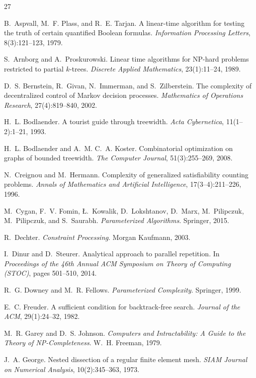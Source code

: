 \documentclass[11pt]{article}
\theoremstyle{plain}
\theoremstyle{definition}
\theoremstyle{remark}
\begin{document}
\begin{thebibliography}{27}

 B.~Aspvall, M.~F. Plass, and R.~E. Tarjan.
A linear-time algorithm for testing the truth of certain quantified Boolean
formulas. \emph{Information Processing Letters}, 8(3):121--123, 1979.

 S.~Arnborg and A.~Proskurowski.
Linear time algorithms for NP-hard problems restricted to partial $k$-trees.
\emph{Discrete Applied Mathematics}, 23(1):11--24, 1989.

 D.~S. Bernstein, R.~Givan, N.~Immerman, and
S.~Zilberstein. The complexity of decentralized control of Markov decision
processes. \emph{Mathematics of Operations Research}, 27(4):819--840, 2002.

 H.~L. Bodlaender.
A tourist guide through treewidth. \emph{Acta Cybernetica},
11(1--2):1--21, 1993.

 H.~L. Bodlaender and A.~M. C.~A. Koster.
Combinatorial optimization on graphs of bounded treewidth.
\emph{The Computer Journal}, 51(3):255--269, 2008.

 N.~Creignou and M.~Hermann.
Complexity of generalized satisfiability counting problems.
\emph{Annals of Mathematics and Artificial Intelligence}, 17(3--4):211--226,
1996.

 M.~Cygan, F.~V. Fomin, \L.~Kowalik, D.~Lokshtanov,
D.~Marx, M.~Pilipczuk, M.~Pilipczuk, and S.~Saurabh. \emph{Parameterized
Algorithms}. Springer, 2015.

 R.~Dechter. \emph{Constraint Processing}.
Morgan Kaufmann, 2003.

 I.~Dinur and D.~Steurer. Analytical approach to
parallel repetition. In \emph{Proceedings of the 46th Annual ACM Symposium
on Theory of Computing (STOC)}, pages 501--510, 2014.

 R.~G. Downey and M.~R. Fellows.
\emph{Parameterized Complexity}. Springer, 1999.

 E.~C. Freuder. A sufficient condition for backtrack-free
search. \emph{Journal of the ACM}, 29(1):24--32, 1982.

 M.~R. Garey and D.~S. Johnson.
\emph{Computers and Intractability: A Guide to the Theory of
NP-Completeness}. W.~H. Freeman, 1979.

 J.~A. George. Nested dissection of a regular finite
element mesh. \emph{SIAM Journal on Numerical Analysis}, 10(2):345--363,
1973.


\end{thebibliography}
\end{document}
